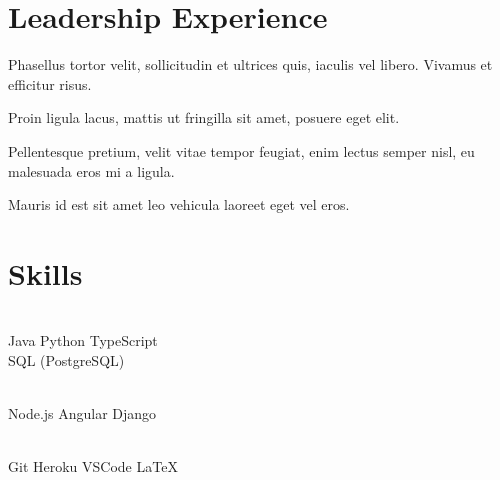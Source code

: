 \documentclass[]{resume}
\begin{document}

\section{Leadership Experience} 

\begin{tightemize}
    \item Phasellus tortor velit, sollicitudin et ultrices quis, iaculis vel libero. Vivamus et efficitur risus. 
    \item Proin ligula lacus, mattis ut fringilla sit amet, posuere eget elit.
\end{tightemize}
\sectionsep

\begin{tightemize}
    \item Pellentesque pretium, velit vitae tempor feugiat, enim lectus semper nisl, eu malesuada eros mi a ligula.
    \item Mauris id est sit amet leo vehicula laoreet eget vel eros.
\end{tightemize}
\sectionsep


\section{Skills}

\begin{minipage}[t]{0.3\textwidth} 
    \sectionsep \\
    Java \textbullet{} Python \textbullet{} TypeScript \textbullet{} \\
    SQL (PostgreSQL)
\end{minipage}
\hfill\vline\hfill
\begin{minipage}[t]{0.3\textwidth} 
    \sectionsep \\
    Node.js \textbullet{} Angular \textbullet{} Django
\end{minipage}
\hfill\vline\hfill
\begin{minipage}[t]{0.3\textwidth} 
    \sectionsep \\
    Git \textbullet{} Heroku \textbullet{} VSCode \textbullet{} \LaTeX
\end{minipage}
\end{document}
